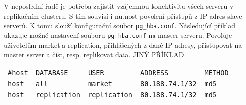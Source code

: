 V neposlední řadě je potřeba zajistit vzájemnou konektivitu všech serverů v replikačním clusteru. S tím souvisí i nutnost povolení přístupů z IP adres slave serverů. K tomu slouží konfigurační soubor \texttt{pg\_hba.conf}. Následující příklad ukazuje možné nastavení souboru \texttt{pg\_hba.conf} na master serveru. Povoluje uživetelům market a replication, přihlášených z dané IP adresy, přistupovat na master server a číst, resp. replikovat data.
{\color{purpurova7}JINÝ PŘÍKLAD}
      \begin{table}[H]
        \label{pgHba}
          \begin{center}
            \begin{tabular}{lllll}
              \texttt{\#host} & \texttt{DATABASE} & \texttt{USER} & \texttt{ADDRESS} & \texttt{METHOD} \\
                \texttt{host} & \texttt{all} & \texttt{market} & \texttt{80.188.74.1/32} & \texttt{md5} \\
       \texttt{host} & \texttt{replication} & \texttt{replication} & \texttt{80.188.74.1/32} &	\texttt{md5} \\
            \end{tabular}
          \end{center}
      \end{table}




